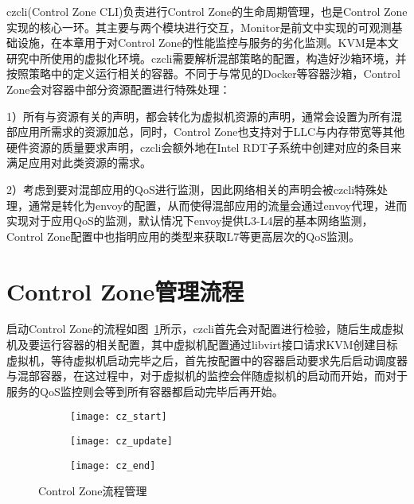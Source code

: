 czcli(Control Zone CLI)负责进行Control Zone的生命周期管理，也是Control Zone实现的核心一环。其主要与两个模块进行交互，Monitor是前文中实现的可观测基础设施，在本章用于对Control Zone的性能监控与服务的劣化监测。KVM是本文研究中所使用的虚拟化环境。czcli需要解析混部策略的配置，构造好沙箱环境，并按照策略中的定义运行相关的容器。不同于与常见的Docker等容器沙箱，Control Zone会对容器中部分资源配置进行特殊处理：

1）所有与资源有关的声明，都会转化为虚拟机资源的声明，通常会设置为所有混部应用所需求的资源加总，同时，Control Zone也支持对于LLC与内存带宽等其他硬件资源的质量要求声明，czcli会额外地在Intel RDT子系统中创建对应的条目来满足应用对此类资源的需求。

2）考虑到要对混部应用的QoS进行监测，因此网络相关的声明会被czcli特殊处理，通常是转化为envoy的配置，从而使得混部应用的流量会通过envoy代理，进而实现对于应用QoS的监测，默认情况下envoy提供L3-L4层的基本网络监测，Control Zone配置中也指明应用的类型来获取L7等更高层次的QoS监测。

\section{Control Zone管理流程}

启动Control Zone的流程如图~\ref{fig:cz_start}所示，czcli首先会对配置进行检验，随后生成虚拟机及要运行容器的相关配置，其中虚拟机配置通过libvirt接口请求KVM创建目标虚拟机，等待虚拟机启动完毕之后，首先按配置中的容器启动要求先后启动调度器与混部容器，在这过程中，对于虚拟机的监控会伴随虚拟机的启动而开始，而对于服务的QoS监控则会等到所有容器都启动完毕后再开始。

\begin{figure}[ht]
    \centering
    
    \begin{subfigure}{.7\textwidth}
        \centering
        \texttt{[image: cz\_start]}
        \label{fig:cz_start}
    \end{subfigure}%
    \begin{subfigure}{.3\textwidth}
        \centering
        \texttt{[image: cz\_update]}
        \label{fig:cz_update}
    \end{subfigure}

    \begin{subfigure}{0.9\textwidth}
        \centering
        \texttt{[image: cz\_end]}
        \label{fig:cz_end}
    \end{subfigure}
    
    \caption{Control Zone流程管理}
    \label{fig:test}
\end{figure}

